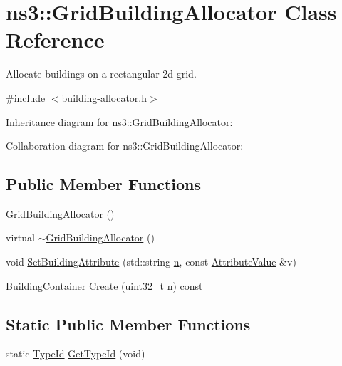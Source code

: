 \hypertarget{classns3_1_1GridBuildingAllocator}{}\section{ns3\+:\+:Grid\+Building\+Allocator Class Reference}
\label{classns3_1_1GridBuildingAllocator}


Allocate buildings on a rectangular 2d grid.  




{\ttfamily \#include $<$building-\/allocator.\+h$>$}



Inheritance diagram for ns3\+:\+:Grid\+Building\+Allocator\+:


Collaboration diagram for ns3\+:\+:Grid\+Building\+Allocator\+:
\subsection*{Public Member Functions}
\begin{DoxyCompactItemize}
\item 
\hyperlink{classns3_1_1GridBuildingAllocator_a01ba55355fb0f6e313aca64554873e43}{Grid\+Building\+Allocator} ()
\item 
virtual \hyperlink{classns3_1_1GridBuildingAllocator_a98e0d61c60406eacb373f60cca528a92}{$\sim$\+Grid\+Building\+Allocator} ()
\item 
void \hyperlink{classns3_1_1GridBuildingAllocator_a179f91b69a9c669ee0c5d0c2d304bf1f}{Set\+Building\+Attribute} (std\+::string \hyperlink{lte__link__budget__x2__handover__measures_8m_abdb05bc5a064cf642a06c83b3392f148}{n}, const \hyperlink{classns3_1_1AttributeValue}{Attribute\+Value} \&v)
\item 
\hyperlink{classns3_1_1BuildingContainer}{Building\+Container} \hyperlink{classns3_1_1GridBuildingAllocator_a83fa0127117f8e23a42ad7ab5b42e7cc}{Create} (uint32\+\_\+t \hyperlink{lte__link__budget__x2__handover__measures_8m_abdb05bc5a064cf642a06c83b3392f148}{n}) const 
\end{DoxyCompactItemize}
\subsection*{Static Public Member Functions}
\begin{DoxyCompactItemize}
\item 
static \hyperlink{classns3_1_1TypeId}{Type\+Id} \hyperlink{classns3_1_1GridBuildingAllocator_a18a0da62eeeb9230f7cf3bb0a71273cd}{Get\+Type\+Id} (void)
\end{DoxyCompactItemize}
